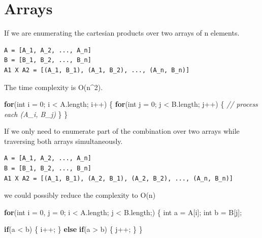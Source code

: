 \documentclass[]{book}
\newenvironment{Shaded}{\begin{snugshade}}{\end{snugshade}}
\newcommand{\CommentTok}[1]{\textcolor[rgb]{0.56,0.35,0.01}{\textit{#1}}}
\newcommand{\DataTypeTok}[1]{\textcolor[rgb]{0.13,0.29,0.53}{#1}}
\newcommand{\DecValTok}[1]{\textcolor[rgb]{0.00,0.00,0.81}{#1}}
\newcommand{\FunctionTok}[1]{\textcolor[rgb]{0.00,0.00,0.00}{#1}}
\newcommand{\KeywordTok}[1]{\textcolor[rgb]{0.13,0.29,0.53}{\textbf{#1}}}
\newcommand{\NormalTok}[1]{#1}
\begin{document}
\hypertarget{arrays}{%
\chapter{Arrays}\label{arrays}}

If we are enumerating the cartesian products over two arrays of n elements.

\begin{verbatim}
A = [A_1, A_2, ..., A_n]
B = [B_1, B_2, ..., B_n]
A1 X A2 = [(A_1, B_1), (A_1, B_2), ..., (A_n, B_n)]
\end{verbatim}

The time complexity is O(n\^{}2).

\begin{Shaded}
\begin{Highlighting}[]
\KeywordTok{for}\NormalTok{(}\DataTypeTok{int}\NormalTok{ i = }\DecValTok{0}\NormalTok{; i < A.}\FunctionTok{length}\NormalTok{; i++) \{}
    \KeywordTok{for}\NormalTok{(}\DataTypeTok{int}\NormalTok{ j = }\DecValTok{0}\NormalTok{; j < B.}\FunctionTok{length}\NormalTok{; j++) \{}
        \CommentTok{// process each (A_i, B_j)}
\NormalTok{    \}}
\NormalTok{\}}
\end{Highlighting}
\end{Shaded}

If we only need to enumerate part of the combination over two arrays while traversing both arrays simultaneously.

\begin{verbatim}
A = [A_1, A_2, ..., A_n]
B = [B_1, B_2, ..., B_n]
A1 X A2 = [(A_1, B_1), (A_2, B_1), (A_2, B_2), ..., (A_n, B_n)]
\end{verbatim}

we could possibly reduce the complexity to O(n)

\begin{Shaded}
\begin{Highlighting}[]
\KeywordTok{for}\NormalTok{(}\DataTypeTok{int}\NormalTok{ i = }\DecValTok{0}\NormalTok{, j = }\DecValTok{0}\NormalTok{; i < A.}\FunctionTok{length}\NormalTok{; j < B.}\FunctionTok{length}\NormalTok{;) \{}
    \DataTypeTok{int}\NormalTok{ a = A[i];}
    \DataTypeTok{int}\NormalTok{ b = B[j];}

    \KeywordTok{if}\NormalTok{(a < b) \{}
\NormalTok{        i++;}
\NormalTok{    \} }\KeywordTok{else} \KeywordTok{if}\NormalTok{(a > b) \{}
\NormalTok{        j++;}
\NormalTok{    \}}
\NormalTok{\}}
\end{Highlighting}
\end{Shaded}
\end{document}
